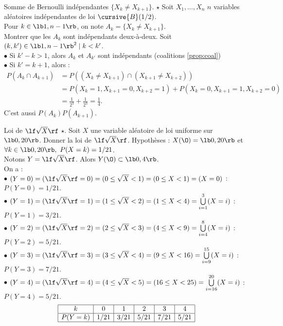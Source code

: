 \documentclass[11pt]{article}
\begin{document}
\begin{exercice}{Somme de Bernoulli indépendantes $\{X_k\neq X_{k+1}\}$. $\star$}{}
    Soit $X_1,...,X_n$ $n$ variables aléatoires indépendantes de loi $\cursive{B}(1/2)$.\\
    Pour $k\in\lb1,n-1\rb$, on note $A_k=\{X_k\neq X_{k+1}\}$.\\
    Montrer que les $A_k$ sont indépendants deux-à-deux.
    \tcblower
    Soit $(k,k')\in\lb1,n-1\rb^2 \mid k < k'$.\\
    $\bullet$ Si $k'-k>1$, alors $A_k$ et $A_{k'}$ sont indépendants (coalitions \ref{prop:coal})\\
    $\bullet$ Si $k'=k+1$, alors :
    \begin{align*}
        P(A_k\cap A_{k+1})&=P((X_k\neq X_{k+1})\cap(X_{k+1}\neq X_{k+2}))\\
        &=P(X_k=1,X_{k+1}=0,X_{k+2}=1)+P(X_k=0,X_{k+1}=1,X_{k+2}=0)\\
        &=\frac{1}{2^3}+\frac{1}{2^3}=\frac{1}{4}.
    \end{align*}
    C'est aussi $P(A_k)P(A_{k+1})$.
\end{exercice}

\pagebreak

\begin{exercice}{Loi de $\lf \sqrt{X} \rf$ $\star$.}{}
    Soit $X$ une variable aléatoire de loi uniforme sur $\lb0,20\rb$. Donner la loi de $\lf\sqrt{X}\rf$.
    \tcblower
    Hypothèses : $X(\O)=\lb0,20\rb$ et $\forall k \in \lb0,20\rb,~P(X=k)=1/21$.\\
    Notons $Y=\lf\sqrt{X}\rf$. Alors $Y(\O)\subset\lb0,4\rb$.\\
    On a :\\
    $\bullet$ $(Y=0)=(\lf\sqrt{X}\rf=0)=(0\leq\sqrt{X}<1)=(0\leq X<1)=(X=0)$ : $P(Y=0)=1/21$.\\
    $\bullet$ $(Y=1)=(\lf\sqrt{X}\rf=1)=(1\leq\sqrt{X}<2)=(1\leq X<4)=\bigcup\limits_{i=1}^3(X=i)$ : $P(Y=1)=3/21$.\\
    $\bullet$ $(Y=2)=(\lf\sqrt{X}\rf=2)=(2\leq\sqrt{X}<3)=(4\leq X<9)=\bigcup\limits_{i=4}^8(X=i)$ : $P(Y=2)=5/21$.\\
    $\bullet$ $(Y=3)=(\lf\sqrt{X}\rf=3)=(3\leq\sqrt{X}<4)=(9\leq X<16)=\bigcup\limits_{i=9}^{15}(X=i)$ : $P(Y=3)=7/21$.\\
    $\bullet$ $(Y=4)=(\lf\sqrt{X}\rf=4)=(4\leq\sqrt{X}<5)=(16 \leq X < 25)=\bigcup\limits_{i=16}^{20}(X=i)$ : $P(Y=4)=5/21$.
    \begin{eqnarray*}
        \begin{array}{|c|c|c|c|c|c|}
            \hline
            k & 0 & 1 & 2 & 3 & 4\\
            \hline
            P(Y=k) & 1/21 & 3/21 & 5/21 & 7/21 & 5/21\\
            \hline
        \end{array}
    \end{eqnarray*}
\end{exercice}
\end{document}
